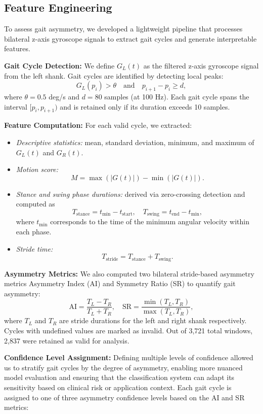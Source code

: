 \subsection{Feature Engineering}
To assess gait asymmetry, we developed a lightweight pipeline that processes bilateral z-axis gyroscope signals to extract gait cycles and generate 
interpretable features.

\textbf{Gait Cycle Detection:}
We define $G_L(t)$ as the filtered z-axis gyroscope signal from the left shank. Gait cycles are identified by detecting local peaks:
\[
G_L(p_i) > \theta \quad \text{and} \quad p_{i+1} - p_i \geq d,
\]
where $\theta = 0.5$ deg/s and $d = 80$ samples (at 100 Hz). Each gait cycle spans the interval $[p_i, p_{i+1})$ and is retained only if its duration 
exceeds 10 samples.

\textbf{Feature Computation:}
For each valid cycle, we extracted:
\begin{itemize}
    \item \textit{Descriptive statistics:} mean, standard deviation, minimum, and maximum of $G_L(t)$ and $G_R(t)$.
    \item \textit{Motion score:}
    \[
    M = \max(|G(t)|) - \min(|G(t)|).
    \]
    \item \textit{Stance and swing phase durations:} derived via zero-crossing detection and computed as
    \[
    T_{\text{stance}} = t_{\min} - t_{\text{start}}, \quad
    T_{\text{swing}} = t_{\text{end}} - t_{\min},
    \]
    where $t_{\min}$ corresponds to the time of the minimum angular velocity within each phase.
    \item \textit{Stride time:}
    \[
    T_{\text{stride}} = T_{\text{stance}} + T_{\text{swing}}.
    \]
\end{itemize}

\textbf{Asymmetry Metrics:}
We also computed two bilateral stride-based asymmetry metrics Asymmetry Index (AI) and Symmetry Ratio (SR) to quantify gait asymmetry:
\[
\text{AI} = \frac{T_L - T_R}{T_L + T_R}, \quad
\text{SR} = \frac{\min(T_L, T_R)}{\max(T_L, T_R)},
\]
where $T_L$ and $T_R$ are stride durations for the left and right shank respectively. Cycles with undefined values are marked as invalid. Out of 3,721 total windows, 
2,837 were retained as valid for analysis.

\newpage
\textbf{Confidence Level Assignment:}
Defining multiple levels of confidence allowed us to stratify gait cycles by the degree of asymmetry, enabling more nuanced model evaluation and ensuring that 
the classification system can adapt its sensitivity based on clinical risk or application context. Each gait cycle is assigned to one of three asymmetry confidence 
levels based on the AI and SR metrics:

